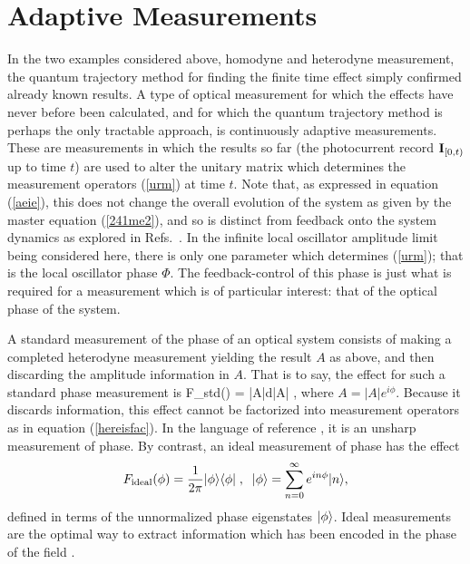 \section{Adaptive Measurements} 

In the two examples considered above, homodyne and heterodyne measurement, the
quantum trajectory method for finding the finite time effect simply confirmed
already known results. A type of optical measurement for which the effects have
never before been calculated, and for which the quantum trajectory method is perhaps
the only tractable approach, is continuously adaptive measurements. These are
measurements in which the results so far (the photocurrent record ${\bf I}_{[0,t)}$ up to time
$t$) are used to alter the unitary matrix which determines the measurement operators
(\ref{urm}) at time $t$. Note that, as expressed in equation (\ref{aeie}), this does
not change the overall evolution of the system as given by the master equation
(\ref{241me2}), and so is distinct from feedback onto the system dynamics as explored
in Refs.~\cite{WisMil93b,WisMil94a,Wis94a}. In the infinite local oscillator amplitude
limit being considered here, there is only one parameter which determines
(\ref{urm}); that is the local oscillator phase $\Phi$. The feedback-control of this
phase is just what is required for a measurement which is of particular interest:
that of the optical phase of the system.

A standard measurement of the phase of an optical system consists of making a
completed heterodyne measurement yielding the result $A$ as above, and then
discarding the amplitude information in $A$. That is to say, the effect for such a
standard phase measurement is
\beq
F_{\rm std}(\phi) = \int |A|d|A|  ,
\eeq
where $A=|A|e^{i\phi}$. Because it discards information, this effect cannot be
factorized into measurement operators as in equation (\ref{hereisfac}). In the
language of reference \cite{Uff93}, it is an unsharp measurement of phase. By contrast,
an ideal measurement of phase \cite{Lon27,PSphase93,LeoVacBohPau95} has the
effect 
\begin{equation} \label{Fopt1}
 {F}_{\rm ideal}(\phi)=\frac{1}{2\pi} |{\phi}\rangle\langle{\phi}| \; , \;\;
|{\phi}\rangle = \sum_{n=0}^\infty e^{i n \phi} |{n}\rangle,
\end{equation}
defined in terms of the unnormalized phase eigenstates $| {\phi} \rangle$. Ideal measurements
are the optimal way to extract information which has been encoded in the phase of the
field \cite{HalFus91}.

